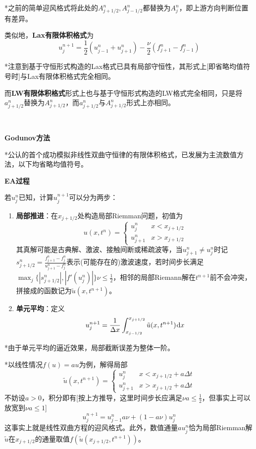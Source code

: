 \documentclass[a4paper,UTF8,fontset=windows]{ctexart}
\newcommand*{\dr}{\hspace{0.07em}\mathrm{d}}
\begin{document}
*之前的简单迎风格式将此处的$A_{j+1/2}^n,A_{j-1/2}^n$都替换为$A_j^n$，即上游方向判断位置有差异。

类似地，\textbf{Lax有限体积格式}为
$$u_j^{n+1}=\frac{1}{2}(u_{j-1}^n+u_{j+1}^n)-\frac{\nu}{2}(f_{j+1}^n-f_{j-1}^n)$$

*注意到基于守恒形式构造的Lax格式已具有局部守恒性，其形式上[即省略均值符号时]与Lax有限体积格式完全相同。

而\textbf{LW有限体积格式}形式上也与基于守恒形式构造的LW格式完全相同，只是将$a_{j+1/2}^n$替换为$A_{j+1/2}^n$，而$a_{j+1/2}^n$与$A_{j+1/2}^n$形式上亦相同。

\

\textbf{Godunov方法}

*公认的首个成功模拟非线性双曲守恒律的有限体积格式，已发展为主流数值方法，以下均省略均值符号。

\textbf{EA过程}

若$u_j^n$已知，计算$u_j^{n+1}$可以分为两步：
\begin{enumerate}
    \item \textbf{局部推进}：在$x_{j+1/2}$处构造局部Riemman问题，初值为
    $$u(x,t^n)=\begin{cases}u_j^n&x<x_{j+1/2}\\u_{j+1}^n&x>x_{j+1/2}\end{cases}$$
    其真解可能是古典解、激波、接触间断或稀疏波等，当$u_{j+1}^n\ne u_j^n$时记$s_{j+1/2}^n=\frac{f_{j+1}^n-f_j^n}{u_{j+1}^n-f_j^n}$表示(可能存在的)激波速度，若时间步长满足$\max_j\{|s_{j+1/2}^n|,|f'(u_j^n)|\}\nu\le\frac{1}{2}$，相邻的局部Riemann解在$t^{n+1}$前不会冲突，拼接成的函数记为$\tilde{u}(x,t^{n+1})$。

    \item \textbf{单元平均}：定义
    $$u_j^{n+1}=\frac{1}{\Delta x}\int_{x_{j-1/2}}^{x_{j+1/2}}\tilde{u}(x,t^{n+1})\dr x$$
\end{enumerate}

*由于单元平均的逼近效果，局部截断误差为整体一阶。

*以线性情况$f(u)=au$为例，解得局部
$$\tilde{u}(x,t^{n+1})=\begin{cases}u_j^n&x<x_{j+1/2}+a\Delta t\\u_{j+1}^n&x>x_{j+1/2}+a\Delta t\end{cases}$$
不妨设$a>0$，积分即有[按上方推导，这里时间步长应满足$\nu a\le\frac{1}{2}$，但事实上可以放宽到$\nu a\le1$]
$$u_j^{n+1}=u_{j-1}^na\nu+(1-a\nu)u_j^n$$
这事实上就是线性双曲方程的迎风格式。此外，数值通量$au_j^n$恰为局部Riemman解$\tilde{u}$在$x_{j+1/2}$的通量取值$f(\tilde{u}(x_{j+1/2},t^{n+1}))$。
\end{document}
